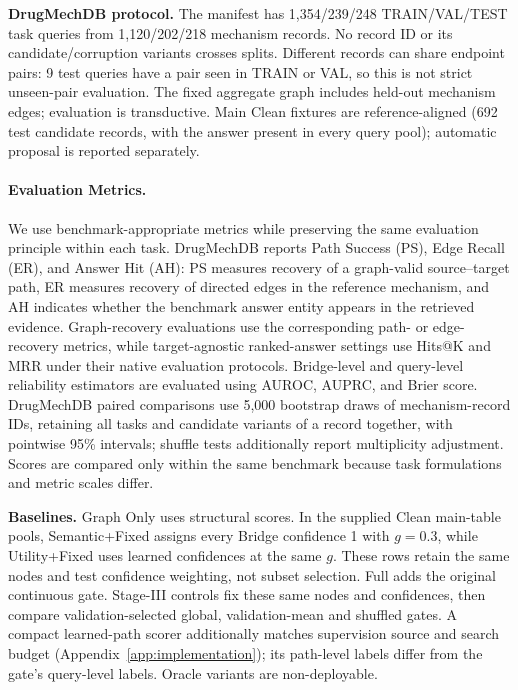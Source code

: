 \documentclass{article} %
\newcommand{\rev}[1]{{\color{blue}#1}}
\begin{document}
\noindent\textbf{DrugMechDB protocol.} The manifest has \rev{1,354/239/248} TRAIN/VAL/TEST task queries from \rev{1,120/202/218} mechanism records. No record ID or its candidate/corruption variants crosses splits. Different records can share endpoint pairs: \rev{9 test queries} have a pair seen in TRAIN or VAL, so this is not strict unseen-pair evaluation. The fixed aggregate graph includes held-out mechanism edges; evaluation is transductive. Main Clean fixtures are reference-aligned (\rev{692 test candidate records}, with the answer present in every query pool); automatic proposal is reported separately.

\paragraph{\textbf{Evaluation Metrics.}}
We use benchmark-appropriate metrics while preserving the same evaluation
principle within each task. DrugMechDB reports Path Success (PS), Edge Recall
(ER), and Answer Hit (AH): PS measures recovery of a graph-valid
source--target path, ER measures recovery of directed edges in the reference
mechanism, and AH indicates whether the benchmark answer entity appears in the
retrieved evidence. Graph-recovery evaluations use the corresponding
path- or edge-recovery metrics, while target-agnostic ranked-answer settings
use Hits@K and MRR under their native evaluation protocols. Bridge-level and
query-level reliability estimators are evaluated using AUROC, AUPRC, and Brier
score. DrugMechDB paired comparisons use 5,000 bootstrap draws of mechanism-record IDs, retaining all tasks and candidate variants of a record together, with pointwise 95\% intervals; shuffle tests additionally report multiplicity adjustment. Scores are compared only within the same benchmark because task formulations and metric scales differ.

\textbf{Baselines.} Graph Only uses structural scores. In the supplied Clean main-table pools, Semantic+Fixed assigns every Bridge confidence 1 with $g=0.3$, while Utility+Fixed uses learned confidences at the same $g$. \rev{These rows retain the same nodes and test confidence weighting, not subset selection.} Full adds the original continuous gate. Stage-III controls fix these same nodes and confidences, then compare validation-selected global, validation-mean and shuffled gates. A compact learned-path scorer additionally matches supervision source and search budget (Appendix~\ref{app:implementation}); its path-level labels differ from the gate's query-level labels. Oracle variants are non-deployable.
\end{document}
